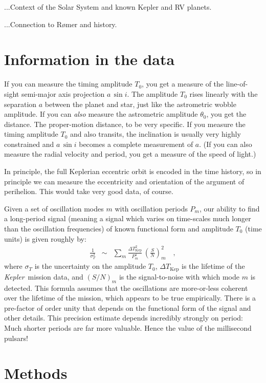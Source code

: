 \documentclass[12pt, preprint]{aastex}
\newcommand{\project}[1]{\textsl{#1}}
\newcommand{\Kepler}{\project{Kepler}}
\newcommand{\DeltaTKepler}{\Delta T_{\mathrm{Kep}}}
\begin{document}
...Context of the Solar System and known Kepler and RV planets.

...Connection to R\o mer and history.

\section{Information in the data}

If you can measure the timing amplitude $T_0$, you get a measure of
the line-of-sight semi-major axis projection $a\,\sin i$.
The amplitude $T_0$ rises linearly with the separation $a$ between the
planet and star, just like the astrometric wobble amplitude.
If you can \emph{also} measure the astrometric amplitude $\theta_0$,
you get the distance.
The proper-motion distance, to be very specific.
If you measure the timing amplitude $T_0$ and also transits, the
inclination is usually very highly constrained and $a\,\sin i$ becomes
a complete measurement of $a$.
(If you can also measure the radial velocity and period, you get a
measure of the speed of light.)

In principle, the full Keplerian eccentric orbit is encoded in the
time history, so in principle we can measure the eccentricity and
orientation of the argument of perihelion.
This would take very good data, of course.

Given a set of oscillation modes $m$ with oscillation periods $P_m$,
our ability to find a long-period signal (meaning a signal which
varies on time-scales much longer than the oscillation frequencies) of
known functional form and amplitude $T_0$ (time units) is given
roughly by:
\begin{eqnarray}
\frac{1}{\sigma_T^2} &\sim& \sum_m \frac{\DeltaTKepler^2}{P_m^4}\,\left(\frac{S}{N}\right)_m^2
\quad ,
\end{eqnarray}
where $\sigma_T$ is the uncertainty on the amplitude $T_0$,
$\DeltaTKepler$ is the lifetime of the \Kepler\ mission data, and
$(S/N)_m$ is the signal-to-noise with which mode $m$ is detected.
This formula assumes that the oscillations are more-or-less coherent
over the lifetime of the mission, which appears to be true
empirically.
There is a pre-factor of order unity that depends on the functional
form of the signal and other details.
This precision estimate depends incredibly strongly on period:
Much shorter periods are far more valuable.
Hence the value of the millisecond pulsars!

\section{Methods}
\end{document}
